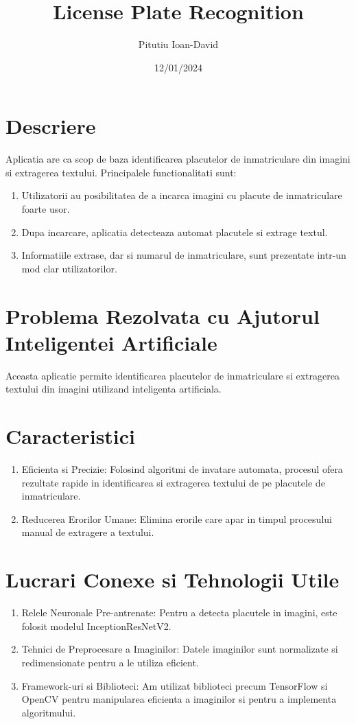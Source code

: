\documentclass[12pt]{article}
\title{License Plate Recognition}
\author{Pitutiu Ioan-David}
\date{12/01/2024}
\begin{document}
\maketitle

\section*{Descriere}
Aplicatia are ca scop de baza identificarea placutelor de inmatriculare din imagini si extragerea textului. Principalele functionalitati sunt:

\begin{enumerate}
  \item Utilizatorii au posibilitatea de a incarca imagini cu placute de inmatriculare foarte usor.
  \item Dupa incarcare, aplicatia detecteaza automat placutele si extrage textul.
  \item Informatiile extrase, dar si numarul de inmatriculare, sunt prezentate intr-un mod clar utilizatorilor.
\end{enumerate}

\section*{Problema Rezolvata cu Ajutorul Inteligentei Artificiale}
Aceasta aplicatie permite identificarea placutelor de inmatriculare si extragerea textului din imagini utilizand inteligenta artificiala.

\section*{Caracteristici}
\begin{enumerate}
  \item Eficienta si Precizie: Folosind algoritmi de invatare automata, procesul ofera rezultate rapide in identificarea si extragerea textului de pe placutele de inmatriculare.
  \item Reducerea Erorilor Umane: Elimina erorile care apar in timpul procesului manual de extragere a textului.
\end{enumerate}

\section*{Lucrari Conexe si Tehnologii Utile}
\begin{enumerate}
  \item Relele Neuronale Pre-antrenate: Pentru a detecta placutele in imagini, este folosit modelul InceptionResNetV2.
  \item Tehnici de Preprocesare a Imaginilor: Datele imaginilor sunt normalizate si redimensionate pentru a le utiliza eficient.
  \item Framework-uri si Biblioteci: Am utilizat biblioteci precum TensorFlow si OpenCV pentru manipularea eficienta a imaginilor si pentru a implementa algoritmului.
\end{enumerate}
\end{document}
